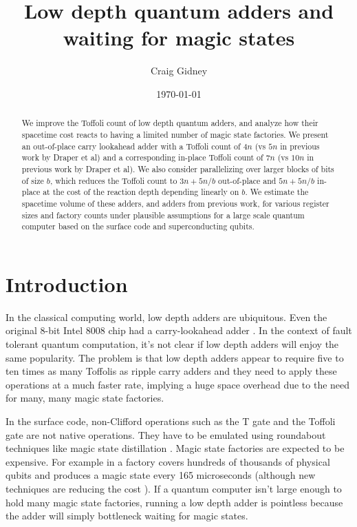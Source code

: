 \documentclass[onecolumn,unpublished]{quantumarticle}
\title{Low depth quantum adders and waiting for magic states}
\date{\today}
\author{Craig Gidney}
\affiliation{Google Inc., Santa Barbara, California 93117, USA}
\theoremstyle{definition}
\theoremstyle{definition}
\theoremstyle{definition}
\begin{document}
\maketitle

\begin{abstract}
    We improve the Toffoli count of low depth quantum adders, and analyze how their spacetime cost reacts to having a limited number of magic state factories.
    We present an out-of-place carry lookahead adder with a Toffoli count of $4n$ (vs $5n$ in previous work by Draper et al) and a corresponding in-place Toffoli count of $7n$ (vs $10n$ in previous work by Draper et al).
    We also consider parallelizing over larger blocks of bits of size $b$, which reduces the Toffoli count to $3n + 5n/b$ out-of-place and $5n + 5n/b$ in-place at the cost of the reaction depth depending linearly on $b$.
    We estimate the spacetime volume of these adders, and adders from previous work, for various register sizes and factory counts under plausible assumptions for a large scale quantum computer based on the surface code and superconducting qubits.
\end{abstract}

\section{Introduction}

In the classical computing world, low depth adders are ubiquitous.
Even the original 8-bit Intel 8008 chip had a carry-lookahead adder \cite{shirriff2020reverseengineer8008}.
In the context of fault tolerant quantum computation, it's not clear if low depth adders will enjoy the same popularity.
The problem is that low depth adders appear to require five to ten times as many Toffolis as ripple carry adders \cite{draper2004lookaheadadder,cuccaro2004adder,gidney2018halving} and they need to apply these operations at a much faster rate, implying a huge space overhead due to the need for many, many magic state factories.

In the surface code, non-Clifford operations such as the T gate and the Toffoli gate are not native operations.
They have to be emulated using roundabout techniques like magic state distillation \cite{bravyi2005magicstate}.
Magic state factories are expected to be expensive.
For example in \cite{gidney2019catalyzed} a factory covers hundreds of thousands of physical qubits and produces a magic state every 165 microseconds (although new techniques are reducing the cost \cite{litinski2019magicnotcostly}).
If a quantum computer isn't large enough to hold many magic state factories, running a low depth adder is pointless because the adder will simply bottleneck waiting for magic states.
\end{document}
